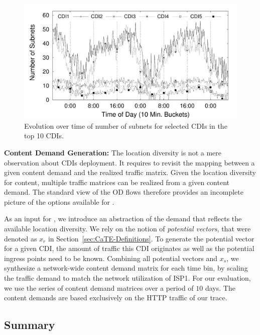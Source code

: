 \begin{figure}[tbp]
\center
\includegraphics[width=1\linewidth]{figures-pdf/SubnetChoice_r-2}
\caption{Evolution over time of number of subnets for selected CDIs in the top 10 CDIs.}
\label{fig:TemporalEffect}
\vspace{-1.5em}
\end{figure}



\noindent\textbf{Content Demand Generation:}\label{sec:TM}
The location diversity is not a mere observation about CDIs deployment. It
requires to revisit the mapping between a given content demand and the realized
traffic matrix. Given the location diversity for content, multiple traffic
matrices can be realized from a given content demand. The standard view of the
OD flows therefore provides an incomplete picture of the options available for
\cate.

As an input for \cate, we introduce an abstraction of the demand that reflects
the available location diversity.  We rely on the notion of \emph{potential
  vectors}, that were denoted as $x_{r}$ in Section~\ref{sec:CaTE-Definitions}.
To generate the potential vector for a given CDI, the amount of traffic this CDI
originates as well as the potential ingress points need to be known. Combining
all potential vectors and $x_{s}$, we synthesize a network-wide content demand
matrix for each time bin, by scaling the traffic demand to match the network
utilization of ISP1.  For our evaluation, we use the series of content demand
matrices over a period of $10$ days. The content demands are based exclusively
on the HTTP traffic of our trace.


\subsection{Summary}

